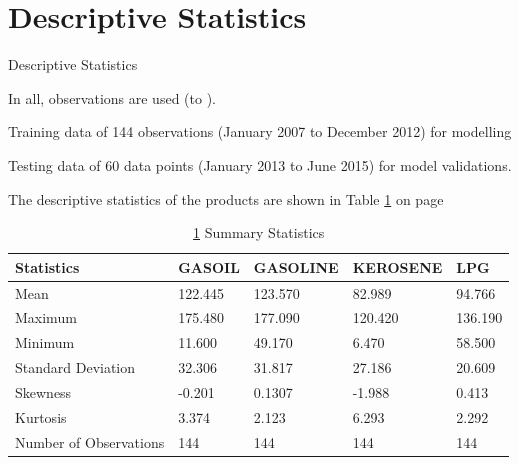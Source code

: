 \documentclass{beamer}
\begin{document}
	
	\section{Descriptive Statistics}
	\label{sec:Descriptive}
	\begin{frame}{Descriptive Statistics}
		\begin{block}{}
			\vspace{4pt}
			In all, \numOfObservations observations are used (\startDate to \finishDate). \vspace{4pt}
		\end{block} \vspace{5pt}
		
		\begin{block}{}
		Training data of 144 observations (January 2007 to December 2012) for modelling \\ \vspace{5pt}
		
		Testing data of 60 data points (January 2013 to June 2015) for model validations.
		\end{block} \vspace{5pt}
	
		\begin{block}{}
			The descriptive statistics of the products are shown in Table \ref{table:description} on page \pageref{table:description}
		\end{block}
	\end{frame}

	\begin{frame}{}
		\begin{table}[]
			\caption{ \ref{table:description} Summary Statistics}
			\begin{tabular}{lllll}
\hline
Statistics             & GASOIL  & GASOLINE & KEROSENE & LPG     \\ \hline
Mean                   & 122.445 & 123.570  & 82.989   & 94.766  \\
Maximum                & 175.480 & 177.090  & 120.420  & 136.190 \\
Minimum                & 11.600  & 49.170   & 6.470    & 58.500  \\
Standard Deviation     & 32.306  & 31.817   & 27.186   & 20.609  \\ 
Skewness               & -0.201  & 0.1307   & -1.988   & 0.413   \\
Kurtosis               & 3.374   & 2.123    & 6.293    & 2.292   \\
Number of Observations & 144     & 144      & 144      & 144     \\ \hline
			\end{tabular}
			\label{table:description}
		\end{table}
	\end{frame}
	
\end{document}
